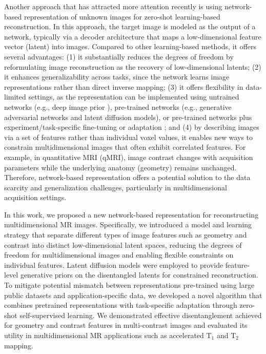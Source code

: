 \documentclass[journal,twoside,web]{ieeecolor}
\begin{document}
Another approach that has attracted more attention recently is using network-based representation of unknown images for zero-shot learning-based reconstruction. In this approach, the target image is modeled as the output of a network, typically via a decoder architecture that maps a low-dimensional feature vector (latent) into images. Compared to other learning-based methods, it offers several advantages: (1) it substantially reduces the degrees of freedom by reformulating image reconstruction as the recovery of low-dimensional latents; (2) it enhances generalizability across tasks, since the network learns image representations rather than direct inverse mapping; (3) it offers flexibility in data-limited settings, as the representation can be implemented using untrained networks (e.g., deep image prior \cite{ulyanov2018deep,yoo2021time}), pre-trained networks (e.g., generative adversarial networks\cite{bora2017compressed} and latent diffusion models\cite{song2023solving}), or pre-trained networks plus experiment/task-specific fine-tuning or adaptation \cite{hussein2020image,narnhofer2019inverse}; and (4) by describing images via a set of features rather than individual voxel values, it enables new ways to constrain multidimensional images that often exhibit correlated features. For example, in quantitative MRI (qMRI), image contrast changes with acquisition parameters while the underlying anatomy (geometry) remains unchanged. Therefore, network-based representation offers a potential solution to the data scarcity and generalization challenges, particularly in multidimensional acquisition settings.

In this work, we proposed a new network-based representation for reconstructing multidimensional MR images. Specifically, we introduced a model and learning strategy that separate different types of image features such as geometry and contrast into distinct low-dimensional latent spaces, reducing the degrees of freedom for multidimensional images and enabling flexible constraints on individual features. Latent diffusion models were employed to provide feature-level generative priors  on the disentangled latents for constrained reconstruction. To mitigate potential mismatch between representations pre-trained using large public datasets and application-specific data, we developed a novel algorithm that combines pretrained representations with task-specific adaptation through zero-shot self-supervised learning. We demonstrated effective disentanglement achieved for geometry and contrast features in multi-contrast images and evaluated its utility in multidimensional MR applications such as accelerated $\text{T}_1$ and $\text{T}_2$ mapping.
\end{document}
